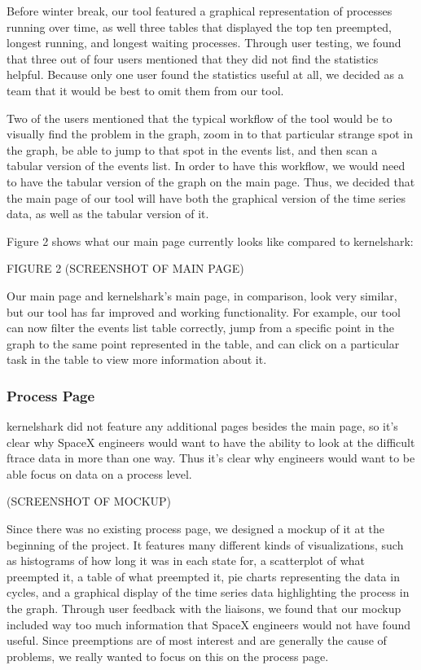 \documentclass{hmcclinic}
\begin{document}
Before winter break, our tool featured a graphical representation of processes running over time, as well three tables that displayed the top ten preempted, longest running, and longest waiting processes. Through user testing, we found that three out of four users mentioned that they did not find the statistics helpful. Because only one user found the statistics useful at all, we decided as a team that it would be best to omit them from our tool.

Two of the users mentioned that the typical workflow of the tool would be to visually find the problem in the graph, zoom in to that particular strange spot in the graph, be able to jump to that spot in the events list, and then scan a tabular version of the events list. In order to have this workflow, we would need to have the tabular version of the graph on the main page. Thus, we decided that the main page of our tool will have both the graphical version of the time series data, as well as the tabular version of it.

Figure 2 shows what our main page currently looks like compared to kernelshark:

FIGURE 2 (SCREENSHOT OF MAIN PAGE)

Our main page and kernelshark's main page, in comparison, look very similar, but our tool has far improved and working functionality. For example, our tool can now filter the events list table correctly, jump from a specific point in the graph to the same point represented in the table, and can click on a particular task in the table to view more information about it.

\subsubsection{Process Page}

kernelshark did not feature any additional pages besides the main page, so it's clear why SpaceX engineers would want to have the ability to look at the difficult ftrace data in more than one way. Thus it's clear why engineers would want to be able focus on data on a process level.

(SCREENSHOT OF MOCKUP)

Since there was no existing process page, we designed a mockup of it at the beginning of the project. It features many different kinds of visualizations, such as histograms of how long it was in each state for, a scatterplot of what preempted it, a table of what preempted it, pie charts representing the data in cycles, and a graphical display of the time series data highlighting the process in the graph. Through user feedback with the liaisons, we found that our mockup included way too much information that SpaceX engineers would not have found useful. Since preemptions are of most interest and are generally the cause of problems, we really wanted to focus on this on the process page.
\end{document}
